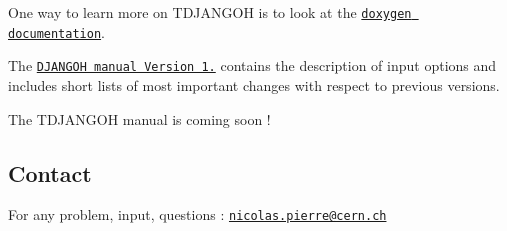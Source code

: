 One way to learn more on T\+D\+J\+A\+N\+G\+OH is to look at the \href{doc/html/index.html}{\tt doxygen documentation}.

The \href{http://wwwthep.physik.uni-mainz.de/~hspiesb/djangoh/djangoh_m.4.6.6.ps.gz}{\tt D\+J\+A\+N\+G\+OH manual Version 1.} contains the description of input options and includes short lists of most important changes with respect to previous versions.

The T\+D\+J\+A\+N\+G\+OH manual is coming soon !

\subsection*{Contact}

For any problem, input, questions \+: \href{mailto:nicolas.pierre@cern.ch}{\tt nicolas.\+pierre@cern.\+ch} 